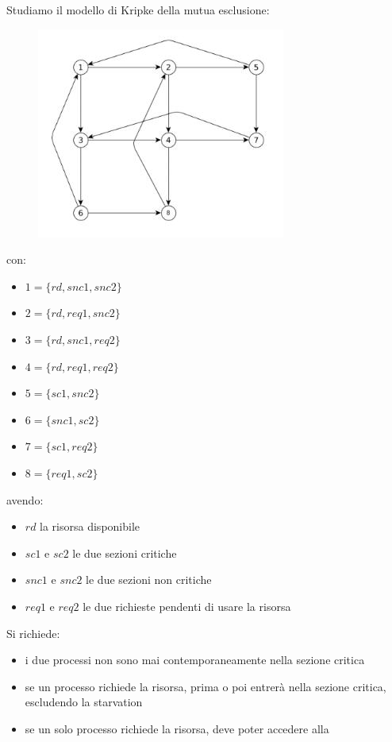 \begin{esempio}
  Studiamo il modello di Kripke della mutua esclusione:
  \begin{figure}[H]
    \centering
    \includegraphics[scale = 0.7]{img/mc2.jpg}
  \end{figure}
  \noindent
  con:
  \begin{itemize}
    \item $1=\{rd, snc1, snc2\}$
    \item $2=\{rd, req1, snc2\}$
    \item $3=\{rd, snc1, req2\}$
    \item $4=\{rd, req1, req2\}$
    \item $5=\{sc1, snc2\}$
    \item $6=\{snc1, sc2\}$
    \item $7=\{sc1, req 2\}$
    \item $8=\{req1, sc2\}$
  \end{itemize}
  avendo:
  \begin{itemize}
    \item $rd$ la risorsa disponibile
    \item $sc1$ e $sc2$ le due sezioni critiche
    \item $snc1$ e $snc2$ le due sezioni non critiche
    \item $req1$ e $req2$ le due richieste pendenti di usare la risorsa
  \end{itemize}
  Si richiede:
  \begin{itemize}
    \item i due processi non sono mai contemporaneamente nella sezione critica
    \item se un processo richiede la risorsa, prima o poi entrerà nella sezione
    critica, escludendo la starvation
    \item se un solo processo richiede la risorsa, deve poter accedere alla

\end{itemize}
\end{esempio}

